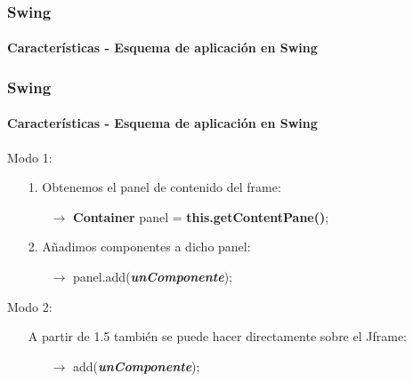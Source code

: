 \documentclass{beamer}
\begin{document}
    \begin{frame}
		\frametitle{Swing}
		\framesubtitle{Caracter\'isticas - Esquema de aplicaci\'on en Swing}
		
    		\begin{center}
		\end{center}
	\end{frame}

	\begin{frame}
		\frametitle{Swing}
		\framesubtitle{Caracter\'isticas - Esquema de aplicaci\'on en Swing}
		
		Modo 1: 
		\begin{itemize}
		    \item[\checkmark] 1. Obtenemos el panel de contenido del frame:
		    \begin{itemize}
        		    \item[$\rightarrow$] \textbf{Container} panel = \textbf{this.getContentPane()};
        		\end{itemize}
		    \item[\checkmark] 2. A\~nadimos componentes a dicho panel:
		    \begin{itemize}
        		    \item[$\rightarrow$] panel.add(\emph{\textbf{unComponente}});
        		\end{itemize}        		
		\end{itemize}
		
		Modo 2:
		\begin{itemize}
		    \item[\checkmark] A partir de 1.5 tambi\'en se puede hacer directamente sobre el Jframe:
		    \begin{itemize}
        		    \item[$\rightarrow$] add(\emph{\textbf{unComponente}});
        		\end{itemize}
		\end{itemize}
	\end{frame}
\end{document}
